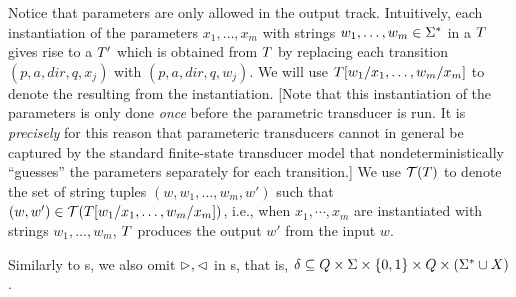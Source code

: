 Notice that parameters are only allowed in the output track.
Intuitively, each instantiation of the parameters $x_1,\ldots,x_m$ with strings 
$w_1,\ldots, w_m \in \Sigma^*$ in a \PPT{} $T$ gives rise to a \FFT{} $T'$ which is obtained from $T$ by replacing each transition $(p, a, dir, q, x_j)$ with $(p, a, dir, q, w_j)$. We will use $T[w_1/x_1,\ldots,w_m/x_m]$ to denote the \FFT{} resulting from the instantiation.
[Note that this instantiation of the parameters is only done 
\emph{once} before the parametric transducer is run. It is \emph{precisely}
for this reason that parameteric transducers cannot in general be captured by 
the standard finite-state transducer model that nondeterministically ``guesses''
the parameters separately for each transition.]  
We use $\mathcal{T}(T)$ to denote the set of string tuples 
$(w, w_1, \ldots, w_m, w')$ such that 
$(w,w') \in \mathcal{T}(T[w_1/x_1,\ldots,w_m/x_m])$, i.e., when
$x_1,\cdots, x_m$ are instantiated with strings $w_1,\ldots, w_m$, 
$T$ produces the output $w'$ from the input $w$. 

Similarly to \FT{}s, we also omit $\vartriangleright, \vartriangleleft$ in \PT{}s, that is, $\delta \subseteq Q \times 
    \Sigma \times \{0, 1\} \times 
    Q \times (\Sigma^* \cup X)$.




